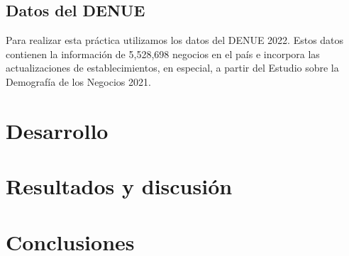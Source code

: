 \documentclass{article}
\begin{document}
\subsection{Datos del DENUE}

Para realizar esta práctica utilizamos los datos del DENUE 2022. Estos datos
contienen la información de 5,528,698 negocios en el país e incorpora las
actualizaciones de establecimientos, en especial, a partir del Estudio sobre la
Demografía de los Negocios 2021. 

\section{Desarrollo}


\section{Resultados y discusión}

\section{Conclusiones}
\end{document}
